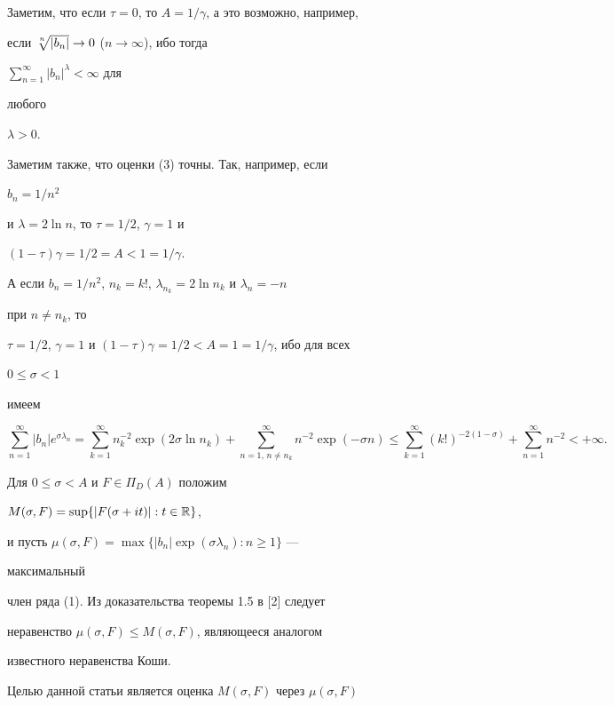  


Заметим, что если $\tau=0$, то $A=1/\gamma$, а это возможно, например, 


если $\sqrt[\uproot{2}n]{|b_n|}\to 0$ ($n\to\infty$), ибо тогда 


$\sum\limits^\infty_{n=1}|b_n|^\lambda<\infty$ для 


любого 


$\lambda>0$. 


 


Заметим также, что оценки (3) точны. Так, например, если 


$b_n=1/n^2$ 


и $\lambda=2\ln n$, то $\tau=1/2$, $\gamma=1$ и 


$(1-\tau)\gamma=1/2=A<1=1/\gamma$. 


А если $b_n=1/n^2$, $n_k=k!$, $\lambda_{n_k}=2\ln n_k$ и $\lambda_n=-n$ 


при $n\ne n_k$, то 


$\tau=1/2$, $\gamma=1$ и $(1-\tau)\gamma=1/2<A=1=1/\gamma$, ибо для всех 


$0\le\sigma<1$ 


имеем 


$$ 


\sum^\infty_{n=1}|b_n|e^{\sigma\lambda_n}= 


\sum^\infty_{k=1}n^{-2}_k\exp(2\sigma\ln n_k)+ 


\sum^\infty_{n=1,\,n\ne n_k}n^{-2}\exp(-\sigma n)\le 


\sum^\infty_{k=1}(k!)^{-2(1-\sigma)}+ 


\sum^\infty_{n=1}n^{-2}<+\infty. 


$$ 


 


Для $0\le \sigma<A$ и $F\in\Pi_D(A)$ положим 


$M(\sigma,F)=\sup\{|F(\sigma+it)|:t\in\Bbb R\}$, 


и пусть $\mu(\sigma,F)=\max\{|b_n|\exp(\sigma\lambda_n):n\ge 1\}$ --- 


максимальный 


член ряда (1). Из доказательства теоремы 1.5 в [2] следует 


неравенство $\mu(\sigma,F)\le M(\sigma,F)$, являющееся аналогом 


известного неравенства Коши. 


 


Целью данной статьи является оценка $M(\sigma,F)$ через $\mu(\sigma,F)$ 


